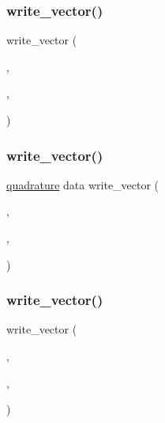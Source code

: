 \subsubsection{\texorpdfstring{write\+\_\+vector()}{write\_vector()}\hspace{0.1cm}{\footnotesize\ttfamily [2/8]}}
{\footnotesize\ttfamily write\+\_\+vector (\begin{DoxyParamCaption}\item[{\hyperlink{a00473_ae0527cbfd56392d5095a691bbf10ba5b}{f\+ID}}]{,  }\item[{s}]{,  }\item[{\textquotesingle{}s\textquotesingle{}}]{ }\end{DoxyParamCaption})}

\mbox{\label{a00473_ac21efe0e68f68168e2ddacde77fa8715}} 
\subsubsection{\texorpdfstring{write\+\_\+vector()}{write\_vector()}\hspace{0.1cm}{\footnotesize\ttfamily [3/8]}}
{\footnotesize\ttfamily \hyperlink{a00473_ac3595844f3ad3881eaa91da23069d5eb}{quadrature} data write\+\_\+vector (\begin{DoxyParamCaption}\item[{\hyperlink{a00473_ae0527cbfd56392d5095a691bbf10ba5b}{f\+ID}}]{,  }\item[{rq}]{,  }\item[{\textquotesingle{}rq\textquotesingle{}}]{ }\end{DoxyParamCaption})}

\mbox{\label{a00473_a97b63d67ee37fc31143a4908c76526d2}} 
\subsubsection{\texorpdfstring{write\+\_\+vector()}{write\_vector()}\hspace{0.1cm}{\footnotesize\ttfamily [4/8]}}
{\footnotesize\ttfamily write\+\_\+vector (\begin{DoxyParamCaption}\item[{\hyperlink{a00473_ae0527cbfd56392d5095a691bbf10ba5b}{f\+ID}}]{,  }\item[{sq}]{,  }\item[{\textquotesingle{}sq\textquotesingle{}}]{ }\end{DoxyParamCaption})}


